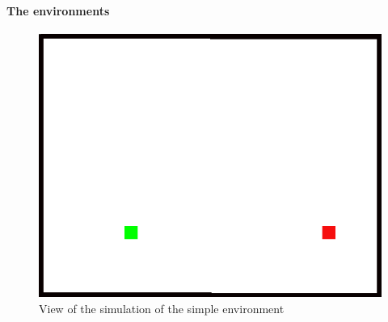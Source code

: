 \documentclass[12pt,svgnames,table]{beamer}
\begin{document}
\begin{frame}
\frametitle{\insertsection}
\framesubtitle{\footnotesize The environments}
\begin{figure}
  \includegraphics[scale = 0.2]{images/1Dultrasimple.png}
  \caption{View of the simulation of the simple environment}
  \label{fig:my-figure}
\end{figure}
\end{frame}
\end{document}
